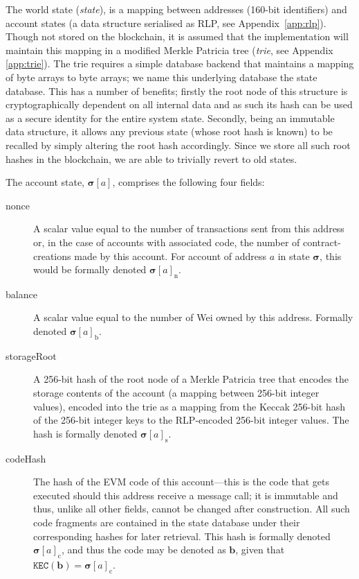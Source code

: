 \documentclass[9pt,oneside]{amsart}
\makeatletter
\newcommand{\linkdest}[1]{\Hy@raisedlink{\hypertarget{#1}{}}}
\makeatother
\begin{document}
\begin{multicols}{2}
The world state (\textit{state}), is a mapping between addresses (160-bit identifiers) and account states (a data structure serialised as RLP, see Appendix~\ref{app:rlp}). Though not stored on the blockchain, it is assumed that the implementation will maintain this mapping in a modified Merkle Patricia tree (\textit{trie}, see Appendix \ref{app:trie}). The trie requires a simple database backend that maintains a mapping of byte arrays to byte arrays; we name this underlying database the state database. This has a number of benefits; firstly the root node of this structure is cryptographically dependent on all internal data and as such its hash can be used as a secure identity for the entire system state. Secondly, being an immutable data structure, it allows any previous state (whose root hash is known) to be recalled by simply altering the root hash accordingly. Since we store all such root hashes in the blockchain, we are able to trivially revert to old states.

The account state, $\boldsymbol{\sigma}[a]$, comprises the following four fields:

\begin{description}
\item[nonce] \linkdest{account_nonce}A scalar value equal to the number of transactions sent from this address or, in the case of accounts with associated code, the number of contract-creations made by this account. For account of address $a$ in state $\boldsymbol{\sigma}$, this would be formally denoted $\boldsymbol{\sigma}[a]_{\mathrm{n}}$.
\item[balance] A scalar value equal to the number of Wei owned by this address. Formally denoted $\boldsymbol{\sigma}[a]_{\mathrm{b}}$.
\item[storageRoot] A 256-bit hash of the root node of a Merkle Patricia tree that encodes the storage contents of the account (a mapping between 256-bit integer values), encoded into the trie as a mapping from the Keccak 256-bit hash of the  256-bit integer keys to the RLP-encoded 256-bit integer values. The hash is formally denoted $\boldsymbol{\sigma}[a]_{\mathrm{s}}$.
\item[codeHash] The hash of the EVM code of this account---this is the code that gets executed should this address receive a message call; it is immutable and thus, unlike all other fields, cannot be changed after construction. All such code fragments are contained in the state database under their corresponding hashes for later retrieval. This hash is formally denoted $\boldsymbol{\sigma}[a]_{\mathrm{c}}$, and thus the code may be denoted as $\mathbf{b}$, given that $\texttt{KEC}(\mathbf{b}) = \boldsymbol{\sigma}[a]_{\mathrm{c}}$.
\end{description}


\end{multicols}
\end{document}
